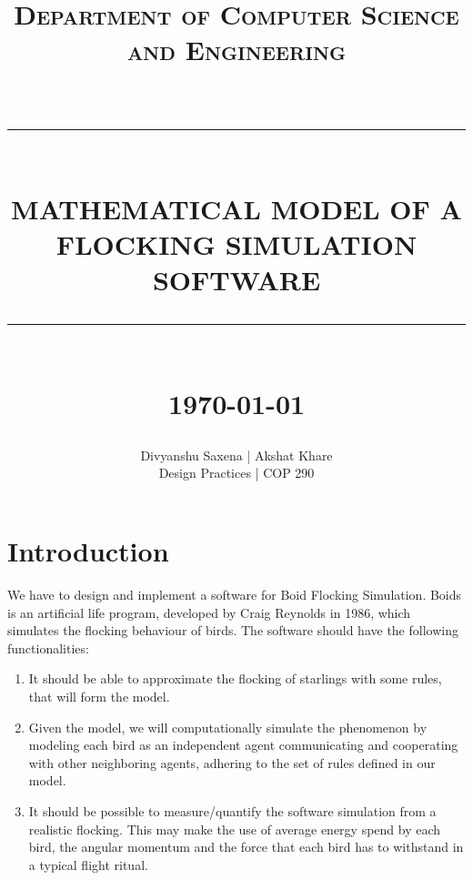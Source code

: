 \documentclass[12pt]{report}
\newcommand{\HRule}[1]{\rule{\linewidth}{#1}}
\begin{document}
\title{ \normalfont  \textsc{Department of Computer Science and Engineering} \\[2pt]
		\\ [2.0cm]
		\HRule{0.5pt} \\
		\LARGE \textbf{\uppercase{Mathematical Model of a Flocking Simulation Software }}
		\HRule{2pt} \\ [0.5cm]
		\normalsize \today \vspace*{5\baselineskip}}

\date{}

\author{
		Divyanshu Saxena | Akshat Khare \\ 
		Design Practices | COP 290   \\
		 }

\maketitle
\tableofcontents
\newpage

\sectionfont{\scshape}


\section*{Introduction}
We have to design and implement a software for Boid Flocking Simulation. Boids is an artificial life program, developed by Craig Reynolds in 1986, which simulates the flocking behaviour of birds.
The software should have the following functionalities:
\begin{enumerate}
\item It should be able to approximate the flocking of starlings with some rules, that will form the model.
\item Given the model, we will computationally simulate the phenomenon by modeling each bird as an independent agent communicating and cooperating with other neighboring agents, adhering to the set of rules defined in our model.
\item It should be possible to measure/quantify the software simulation from a realistic flocking. This may make the use of average energy spend by each bird, the angular momentum and the force that each bird has to withstand in a typical flight ritual.
\end{enumerate}
\end{document}

